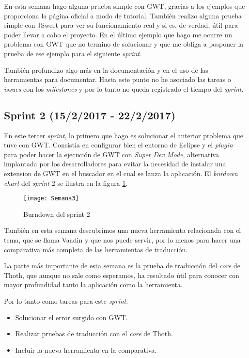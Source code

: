 En esta semana hago alguna prueba simple con GWT, gracias a los ejemplos que proporciona la página oficial a modo de tutorial. También realizo alguna prueba simple con JSweet para ver su funcionamiento real y si es, de verdad, útil para poder llevar a cabo el proyecto. En el último ejemplo que hago me ocurre un problema con GWT que no termino de solucionar y que me obliga a posponer la prueba de ese ejemplo para el siguiente \emph{sprint}.

También profundizo algo más en la documentación y en el uso de las herramientas para documentar. Hasta este punto no he asociado las tareas o \emph{issues} con los \emph{milestones} y por lo tanto no queda registrado el tiempo del \emph{sprint}.

\subsection{Sprint 2 (15/2/2017 - 22/2/2017)}

En este tercer \emph{sprint}, lo primero que hago es solucionar el anterior problema que tuve con GWT. Consistía en configurar bien el entorno de Eclipse y el \emph{plugin} para poder hacer la ejecución de GWT con \emph{Super Dev Mode}, alternativa implantada por los desarrolladores para evitar la necesidad de instalar una extension de GWT en el buscador en el cual se lanza la aplicación. El \emph{burdown chart} del \emph{sprint} 2 se ilustra en la figura \ref{fig:A.1}.

\begin{figure}[h]
\centering
\texttt{[image: Semana3]}
\caption{Burndown del sprint 2}
\label{fig:A.1}
\end{figure}

También en esta semana descubrimos una nueva herramienta relacionada con el tema, que se llama Vaadin y que nos puede servir, por lo menos para hacer una comparativa más completa de las herramientas de traducción. 

La parte más importante de esta semana es la prueba de traducción del \emph{core} de Thoth, que aunque no sale como esperamos, ha resultado útil para conocer con mayor profundidad tanto la aplicación como la herramienta.

Por lo tanto como tareas para este \emph{sprint}:

\begin{itemize}
\item Solucionar el error surgido con GWT.
\item Realizar pruebas de traducción con el \emph{core} de Thoth.
\item Incluir la nueva herramienta en la comparativa.
\end{itemize}

